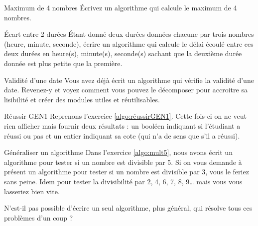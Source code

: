 	\begin{Exercice}{Maximum de 4 nombres}
		Écrivez un algorithme qui calcule le maximum de 4 nombres.
	\end{Exercice}

	\begin{Exercice}{Écart entre 2 durées}
		Étant donné deux durées données chacune par trois
		nombres (heure, minute, seconde),
		écrire un algorithme qui calcule
		le délai écoulé entre ces deux durées en heure(s), minute(s),
		seconde(s) sachant que la deuxième durée donnée 
		est plus petite que la première.
	\end{Exercice}
	
	\begin{Exercice}{Validité d'une date}
		Vous avez déjà écrit un algorithme
		qui vérifie la validité d'une date.
		Revenez-y et voyez comment
		vous pouvez le décomposer
		pour accroitre sa lisibilité
		et créer des modules utiles et réutilisables.
	\end{Exercice}

	\begin{Exercice}{Réussir GEN1}
		Reprenons l'exercice \vref{algo:réussirGEN1}.
		Cette fois-ci on ne veut rien afficher
		mais fournir deux résultats :
		un booléen indiquant si l'étudiant a réussi ou pas
		et un entier indiquant sa cote (qui n'a de sens que s'il a réussi). 
	\end{Exercice}

	\begin{Exercice}{Généraliser un algorithme}
		Dans l'exercice \vref{algo:mult5},
		nous avons écrit un algorithme 
		pour tester si un nombre est divisible par 5.
		Si on vous demande à présent
		un algorithme pour tester si un nombre est divisible par 3,
		vous le feriez sans peine.
		Idem pour tester la divisibilité par 2, 4, 6, 7, 8, 9\dots{}
		mais vous vous lasseriez bien vite.
		
		N'est-il pas possible d'écrire un seul algorithme,
		plus général, qui résolve tous ces problèmes d'un coup ?  
	\end{Exercice}
	
